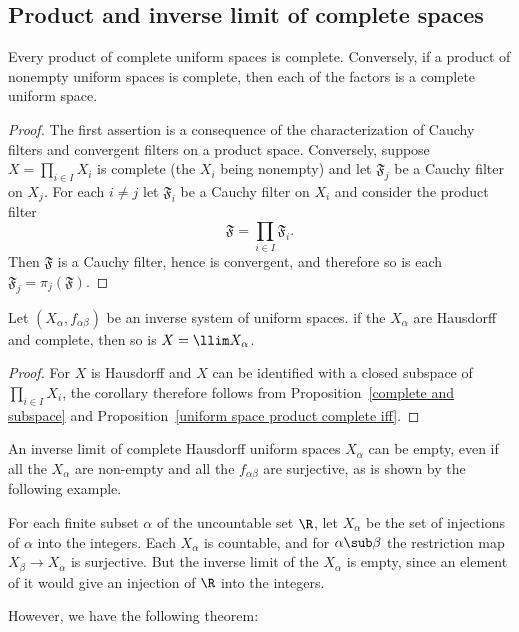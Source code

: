 \subsection{Product and inverse limit of complete spaces}
\begin{proposition}\label{uniform space product complete iff}
Every product of complete uniform spaces is complete. Conversely, if a product of nonempty uniform spaces is complete, then each of the factors is a complete uniform space.
\end{proposition}
\begin{proof}
The first assertion is a consequence of the characterization of Cauchy filters and convergent filters on a product space. Conversely, suppose $X=\prod_{i\in I}X_i$ is complete (the $X_i$ being nonempty) and let $\mathfrak{F}_j$ be a Cauchy filter on $X_j$. For each $i\neq j$ let $\mathfrak{F}_i$ be a Cauchy filter on $X_i$ and consider the product filter
\[\mathfrak{F}=\prod_{i\in I}\mathfrak{F}_i.\]
Then $\mathfrak{F}$ is a Cauchy filter, hence is convergent, and therefore so is each $\mathfrak{F}_j=\pi_j(\mathfrak{F})$.
\end{proof}
\begin{corollary}\label{uniform space inverse limit of complete is complete}
Let $(X_\alpha,f_{\alpha\beta})$ be an inverse system of uniform spaces. if the $X_\alpha$ are Hausdorff and complete, then so is $X=\llim X_\alpha$.
\end{corollary}
\begin{proof}
For $X$ is Hausdorff and $X$ can be identified with a closed subspace of $\prod_{i\in I}X_i$, the corollary therefore follows from Proposition~\ref{complete and subspace} and Proposition~\ref{uniform space product complete iff}.
\end{proof}
An inverse limit of complete Hausdorff uniform spaces $X_\alpha$ can be empty, even if all the $X_\alpha$ are non-empty and all the $f_{\alpha\beta}$ are surjective, as is shown by the following example.
\begin{example}
For each finite subset $\alpha$ of the uncountable set $\R$, let $X_\alpha$ be the set of injections of $\alpha$ into the integers. Each $X_\alpha$ is countable, and for $\alpha\sub\beta$ the restriction map $X_\beta\to X_\alpha$ is surjective. But the inverse limit of the $X_\alpha$ is empty, since an element of it would give an injection of $\R$ into the integers.
\end{example}
However, we have the following theorem:
